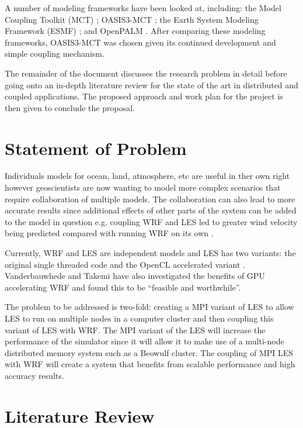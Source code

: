 \documentclass{acm_proc_article-sp}
\renewcommand{\_}{\underscore\hspace{0pt}}
\begin{document}
A number of modeling frameworks have been looked at, including: the Model
Coupling Toolkit (MCT) \cite{Larson2005,Jacob2005}; OASIS3-MCT
\cite{Valcke,Valcke2013}; the Earth System Modeling Framework (ESMF)
\cite{Ramework2004}; and OpenPALM \cite{Piacentini2011}. After comparing these
modeling frameworks, OASIS3-MCT was chosen given its continued development and
simple coupling mechanism.

The remainder of the document discusses the research problem in detail before
going onto an in-depth literature review for the state of the art in distributed
and coupled applications. The proposed approach and work plan for the project is
then given to conclude the proposal.

\section*{Statement of Problem}

Individuals models for ocean, land, atmosphere, etc are useful in ther own right
however geoscientists are now wanting to model more complex scenarios that
require collaboration of multiple models. The collaboration can also lead to
more accurate results since additional effects of other parts of the system can
be added to the model in question e.g. coupling WRF and LES led to greater wind
velocity being predicted compared with running WRF on its own
\cite{Kinbara2010,Nakayama1998}.

Currently, WRF and LES are independent models and LES has two variants: the
original single threaded code and the OpenCL accelerated variant
\cite{Vanderbauwhede2014}. Vanderbauwhede and Takemi \cite{Vanderbauwhede2013}
have also investigated the benefits of GPU accelerating WRF and found this to be
``feasible and worthwhile''.

The problem to be addressed is two-fold: creating a MPI variant of LES to allow
LES to run on multiple nodes in a computer cluster and then coupling this
variant of LES with WRF. The MPI variant of the LES will increase the
performance of the simulator since it will allow it to make use of a multi-node
distributed memory system such as a Beowulf cluster. The coupling of MPI LES
with WRF will create a system that benefits from scalable performance and high
accuracy results.

\section*{Literature Review}
\end{document}
